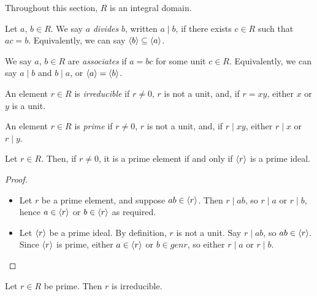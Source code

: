 \documentclass{../../template/note}
\begin{document}
    Throughout this section, $R$ is an integral domain.

    \begin{definition}[Division]
        Let $a$, $b \in R$. We say $a$ \emph{divides} $b$, written $a \mid b$, if there exists $c \in R$ such that $ac = b$. Equivalently, we can say $\left \langle b \right \rangle \subseteq \left \langle a \right \rangle$.
    \end{definition}
    
    \begin{definition}[Associates]
        We say $a$, $b \in R$ are \emph{associates} if $a = bc$ for some unit $c \in R$. Equivalently, we can say $a \mid b$ and $b \mid a$, or $\left \langle a \right \rangle = \left \langle b \right \rangle$.
    \end{definition}
    
    \begin{definition}
        An element $r \in R$ is \emph{irreducible} if $r \neq 0$, $r$ is not a unit, and, if $r = xy$, either $x$ or $y$ is a unit.
    \end{definition}
    
    \begin{definition}
        An element $r \in R$ is \emph{prime} if $r \neq 0$, $r$ is not a unit, and, if $r \mid xy$, either $r \mid x$ or $r \mid y$.
    \end{definition}
    
    \begin{proposition}
        Let $r \in R$. Then, if $r \neq 0$, it is a prime element if and only if $\left \langle r \right \rangle$ is a prime ideal.
    \end{proposition}
    
    \begin{proof}\
        \begin{itemize}
            \item[$\implies$] Let $r$ be a prime element, and suppose $ab \in \left \langle r \right \rangle$. Then $r \mid ab$, so $r \mid a$ or $r \mid b$, hence $a \in \left \langle r \right \rangle$ or $b \in \left \langle r \right \rangle$ as required.
            \item[$\impliedby$] Let $\left \langle r \right \rangle$ be a prime ideal. By definition, $r$ is not a unit. Say $r \mid ab$, so $ab \in \left \langle r \right \rangle$. Since $\left \langle r \right \rangle$ is prime, either $a \in \left \langle r \right \rangle$ or $b \in gen r$, so either $r \mid a$ or $r \mid b$. 
        \end{itemize}
    \end{proof}
    
    \begin{proposition}
        Let $r \in R$ be prime. Then $r$ is irreducible.
    \end{proposition}
    
\end{document}
